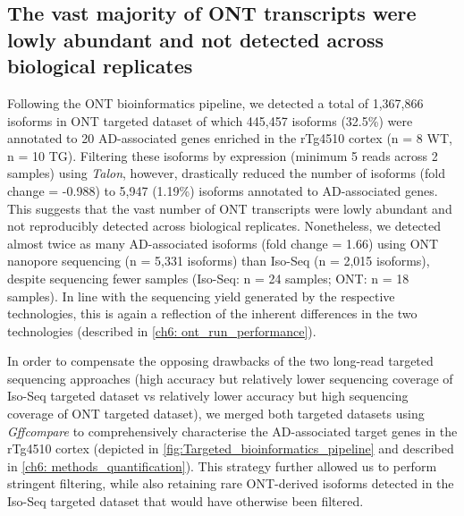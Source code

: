 \clearpage
\subsection{The vast majority of ONT transcripts were lowly abundant and not detected across biological replicates}
Following the ONT bioinformatics pipeline, we detected a total of 1,367,866 isoforms in ONT targeted dataset of which 445,457 isoforms (32.5\%) were annotated to 20 AD-associated genes enriched in the rTg4510 cortex (n = 8 WT, n = 10 TG). Filtering these isoforms by expression (minimum 5 reads across 2 samples) using \textit{Talon}, however, drastically reduced the number of isoforms (fold change = -0.988) to 5,947 (1.19\%) isoforms annotated to AD-associated genes. This suggests that the vast number of ONT transcripts were lowly abundant and not reproducibly detected across biological replicates. Nonetheless, we detected almost twice as many AD-associated isoforms (fold change = 1.66) using ONT nanopore sequencing (n = 5,331 isoforms) than Iso-Seq (n = 2,015 isoforms), despite sequencing fewer samples (Iso-Seq: n = 24 samples; ONT: n = 18 samples). In line with the sequencing yield generated by the respective technologies, this is again a reflection of the inherent differences in the two technologies (described in \cref{ch6: ont_run_performance}). 

In order to compensate the opposing drawbacks of the two long-read targeted sequencing approaches (high accuracy but relatively lower sequencing coverage of Iso-Seq targeted dataset vs relatively lower accuracy but high sequencing coverage of ONT targeted dataset), we merged both targeted datasets using \textit{Gffcompare} to comprehensively characterise the AD-associated target genes in the rTg4510 cortex (depicted in \cref{fig:Targeted_bioinformatics_pipeline} and described in \cref{ch6: methods_quantification}). This strategy further allowed us to perform stringent filtering, while also retaining rare ONT-derived isoforms detected in the Iso-Seq targeted dataset that would have otherwise been filtered. 


